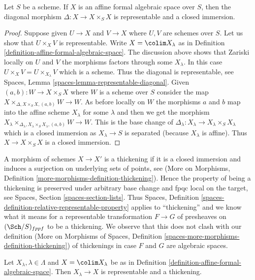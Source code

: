 \begin{lemma}
\label{lemma-diagonal-affine-formal-algebraic-space}
Let $S$ be a scheme. If $X$ is an affine formal algebraic space over
$S$, then the diagonal morphism $\Delta : X \to X \times_S X$
is representable and a closed immersion.
\end{lemma}

\begin{proof}
Suppose given $U \to X$ and $V \to X$ where $U, V$ are schemes over $S$.
Let us show that $U \times_X V$ is representable. Write $X = \colim X_\lambda$
as in Definition \ref{definition-affine-formal-algebraic-space}.
The discussion above shows that Zariski locally on $U$ and $V$ the morphisms
factors through some $X_\lambda$. In this case
$U \times_X V = U \times_{X_\lambda} V$ which is a scheme.
Thus the diagonal is representable, see
Spaces, Lemma \ref{spaces-lemma-representable-diagonal}.
Given $(a, b) : W \to X \times_S X$ where $W$ is a scheme over $S$
consider the map $X \times_{\Delta, X \times_S X, (a, b)} W \to W$.
As before locally on $W$ the morphisms $a$ and $b$ map into
the affine scheme $X_\lambda$ for some $\lambda$ and then
we get the morphism
$X_\lambda
\times_{\Delta_\lambda, X_\lambda \times_S X_\lambda, (a, b)} W \to W$.
This is the base change of
$\Delta_\lambda : X_\lambda \to X_\lambda \times_S X_\lambda$
which is a closed immersion as $X_\lambda \to S$ is separated
(because $X_\lambda$ is affine).
Thus $X \to X \times_S X$ is a closed immersion.
\end{proof}

\noindent
A morphism of schemes $X \to X'$ is a thickening if it is a closed immersion
and induces a surjection on underlying sets of points, see
(More on Morphisms, Definition
\ref{more-morphisms-definition-thickening}).
Hence the property of being a thickening is preserved under arbitrary
base change and fpqc local on the target, see
Spaces, Section \ref{spaces-section-lists}.
Thus Spaces, Definition \ref{spaces-definition-relative-representable-property}
applies to ``thickening'' and we know what it means for a
representable transformation $F \to G$ of
presheaves on $(\Sch/S)_{fppf}$ to be a thickening.
We observe that this does not clash with our definition
(More on Morphisms of Spaces, Definition
\ref{spaces-more-morphisms-definition-thickening})
of thickenings in case $F$ and $G$ are algebraic spaces.

\begin{lemma}
\label{lemma-covering-by-thickenings}
Let $X_\lambda, \lambda \in \Lambda$ and $X = \colim X_\lambda$
be as in Definition \ref{definition-affine-formal-algebraic-space}.
Then $X_\lambda \to X$ is representable and a thickening.
\end{lemma}

